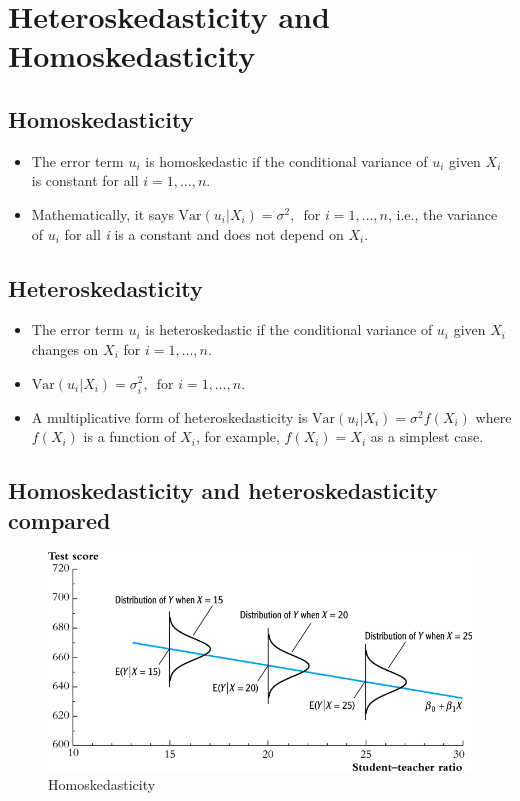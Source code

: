 \documentclass[presentation]{beamer}
\begin{document}
\section*{Heteroskedasticity and Homoskedasticity}
\label{sec:org4a265d0}

\subsection*{Homoskedasticity}
\label{sec:orged4d80b}

\begin{itemize}
\item The error term \(u_i\) is \alert{homoskedastic} if the conditional variance of
\(u_i\) given \(X_i\) is constant for all \(i = 1, \ldots, n\).

\item Mathematically, it says \(\mathrm{Var}(u_i | X_i) = \sigma^2,\, \text{ for }
  i = 1, \ldots, n\), i.e., the variance of \(u_i\) for all \emph{i} is a
constant and does not depend on \(X_i\).
\end{itemize}

\subsection*{Heteroskedasticity}
\label{sec:orgdd8439b}

\begin{itemize}
\item The error term \(u_i\) is \alert{heteroskedastic} if the conditional variance of
\(u_i\) given \(X_i\) changes on \(X_i\) for \(i = 1, \ldots, n\).

\item \(\mathrm{Var}(u_i | X_i) = \sigma^2_i,\, \text{ for } i = 1, \ldots, n\).

\item A multiplicative form of heteroskedasticity is
\(\mathrm{Var}(u_i|X_i) = \sigma^2 f(X_i)\) where \(f(X_i)\) is a
function of \(X_i\), for example, \(f(X_i) = X_i\) as a simplest case.
\end{itemize}

\subsection*{Homoskedasticity and heteroskedasticity compared}
\label{sec:org14085d2}

\begin{figure}[htbp]
\centering
\includegraphics[width=.9\linewidth]{figure/fig-4-4.png}
\caption{Homoskedasticity}
\end{figure} 
\end{document}
